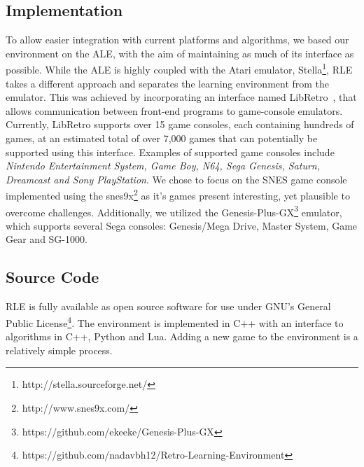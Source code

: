 \documentclass{article}
\begin{document}
\subsection{Implementation}

To allow easier integration with current platforms and algorithms, we based our environment on the ALE, with the aim of maintaining as much of its interface as possible. While the ALE is highly coupled with the Atari emulator, Stella\footnote{http://stella.sourceforge.net/}, RLE takes a different approach and separates the learning environment from the emulator. This was achieved by incorporating an interface named 
 LibRetro~\citep{LibRetro}, that allows communication between front-end programs to game-console emulators. Currently, LibRetro supports over 15 game consoles, each containing hundreds of games, at an estimated total of over 7,000 games that can potentially be supported using this interface. Examples of supported game consoles include \textit{Nintendo Entertainment System, Game Boy, N64, Sega Genesis, Saturn, Dreamcast and Sony PlayStation}. We chose to focus on the SNES game console implemented using the snes9x\footnote{http://www.snes9x.com/} as it's games present interesting, yet plausible to overcome challenges. Additionally, we utilized the Genesis-Plus-GX\footnote{https://github.com/ekeeke/Genesis-Plus-GX} emulator, which supports several Sega consoles: Genesis/Mega Drive, Master System, Game Gear and SG-1000.

\subsection{Source Code}
RLE is fully available as open source software for use under GNU's General Public License\footnote{\label{website}https://github.com/nadavbh12/Retro-Learning-Environment}. The environment is implemented in C++ with an interface to algorithms in C++, Python and Lua.
Adding a new game to the environment is a relatively simple process.
\end{document}
